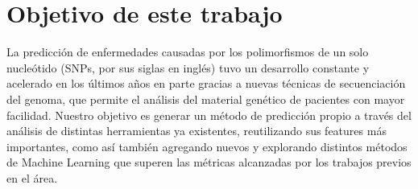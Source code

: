 \section{Objetivo de este trabajo}

La predicción de enfermedades causadas por los polimorfismos de un solo nucleótido (SNPs, por sus siglas en inglés) tuvo un desarrollo constante y acelerado en los últimos años en parte gracias a nuevas técnicas de secuenciación del genoma, que permite el análisis del material genético de pacientes con mayor facilidad. Nuestro objetivo es generar un método de predicción propio a través del análisis de distintas herramientas ya existentes, reutilizando sus features más importantes, como así también agregando nuevos y explorando distintos métodos de Machine Learning que superen las métricas alcanzadas por los trabajos previos en el área.


